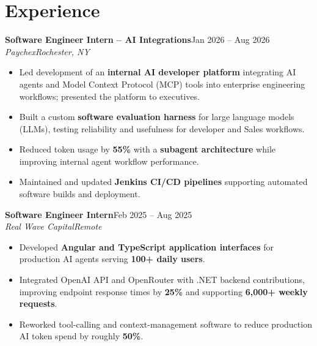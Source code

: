 \documentclass[10pt,letterpaper]{article}
\newif\ifresumeFirstRole
\newcommand{\resumeRole}[4]{\ifresumeFirstRole\global\resumeFirstRolefalse\else\vspace{0pt plus 1fill}\fi\textbf{#1}\hfill #2\\\textit{#3}\hfill\textit{#4}}
\begin{document}
\section*{Experience}
\resumeRole{Software Engineer Intern -- AI Integrations}{Jan 2026 -- Aug 2026}{Paychex}{Rochester, NY}
\begin{itemize}
\item Led development of an \textbf{internal AI developer platform} integrating AI agents and Model Context Protocol (MCP) tools into enterprise engineering workflows; presented the platform to executives.
\item Built a custom \textbf{software evaluation harness} for large language models (LLMs), testing reliability and usefulness for developer and Sales workflows.
\item Reduced token usage by \textbf{55\%} with a \textbf{subagent architecture} while improving internal agent workflow performance.
\item Maintained and updated \textbf{Jenkins CI/CD pipelines} supporting automated software builds and deployment.
\end{itemize}
\resumeRole{Software Engineer Intern}{Feb 2025 -- Aug 2025}{Real Wave Capital}{Remote}
\begin{itemize}
\item Developed \textbf{Angular and TypeScript application interfaces} for production AI agents serving \textbf{100+ daily users}.
\item Integrated OpenAI API and OpenRouter with .NET backend contributions, improving endpoint response times by \textbf{25\%} and supporting \textbf{6,000+ weekly requests}.
\item Reworked tool-calling and context-management software to reduce production AI token spend by roughly \textbf{50\%}.
\end{itemize}
\end{document}
